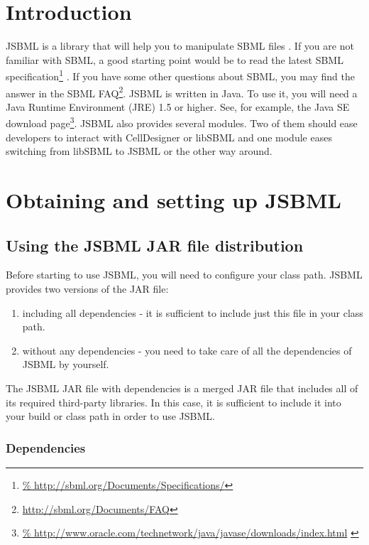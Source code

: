 \section{Introduction}

JSBML is a library that will help you to manipulate SBML files
\citep{Draeger2011, Draeger2011b}. If you are not familiar with SBML, a good
starting point would be to read the latest SBML
specification\footnote{\url{%
http://sbml.org/Documents/Specifications/}} \citep{Hucka2010a}. If you have some
other questions about SBML, you may find the answer in the SBML
FAQ\footnote{\url{http://sbml.org/Documents/FAQ}}. JSBML is written in Java\TTra. To
use it, you will need a Java Runtime Environment (JRE) 1.5 or higher. See, for
example, the Java SE download page\footnote{\url{%
http://www.oracle.com/technetwork/java/javase/downloads/index.html}
\label{fn:jvmldl}}.
JSBML also provides several modules. Two of them should ease developers to
interact with CellDesigner or libSBML and one module eases switching from
libSBML to JSBML or the other way around.


\section{Obtaining and setting up JSBML}

\subsection{Using the JSBML JAR file distribution}
Before starting to use JSBML, you will need to configure your class path. JSBML
provides two versions of the JAR file:
\begin{enumerate}
\item including all dependencies - it is sufficient to include just this file in
      your class path.
\item without any dependencies - you need to take care of all the dependencies of
      JSBML by yourself.
\end{enumerate}

The JSBML JAR file with dependencies is a merged JAR file that includes all of
its required third-party libraries. In this case, it is sufficient to include
it into your build or class path in order to use JSBML.



\subsubsection{Dependencies}
%

